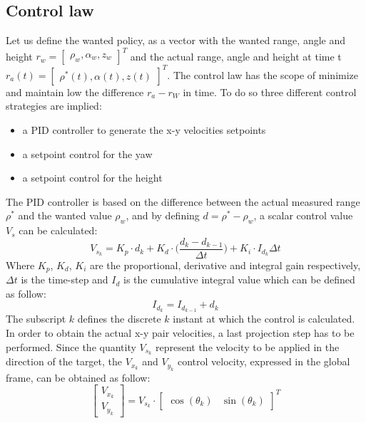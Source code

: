 \subsection{Control law}\label{control_law}
Let us define the wanted policy, as a vector with the wanted range, angle and height $r_w = \begin{bmatrix} \rho_w, \alpha_w, z_w\end{bmatrix}^T$ and the actual range, angle and height at time t $r_a(t) = \begin{bmatrix} \rho^* (t) , \alpha(t), z(t) \end{bmatrix}^T$. The control law has the scope of minimize and maintain low the difference $r_a - r_W$ in time. To do so three different control strategies are implied:
\begin{itemize}
    \item a PID controller to generate the x-y velocities setpoints
    \item a setpoint control for the yaw
    \item a setpoint control for the height
\end{itemize}
The PID controller is based on the difference between the actual measured range $\rho^*$ and the wanted value $\rho_w$, and by defining $d = \rho^* - \rho_w$, a scalar control value $V_s$ can be calculated:
\begin{equation}
    V_{s_k} = K_p\cdot d_k + K_d\cdot\Big(\frac{d_k - d_{k-1}}{\Delta t}\Big) + K_i\cdot I_{d_k}\Delta t
\end{equation}
Where $K_p$, $K_d$, $K_i$ are the proportional, derivative and integral gain respectively, $\Delta t$ is the time-step and $I_d$ is the cumulative integral value which can be defined as follow:
\[
    I_{d_k} = I_{d_{k-1}} + d_k
\]
The subscript $k$ defines the discrete $k$ instant at which the control is calculated. In order to obtain the actual x-y pair velocities, a last projection step has to be performed. Since the quantity $V_{s_k}$ represent the velocity to be applied in the direction of the target, the $V_{x_k}$ and $V_{y_k}$ control velocity, expressed in the global frame, can be obtained as follow:
\begin{equation}\label{PF:VELxy}
    \begin{bmatrix} V_{x_k} \\ V_{y_k} \end{bmatrix} = V_{s_k} \cdot \begin{bmatrix} \cos (\theta_k) & \sin (\theta_k) \end{bmatrix}^T
\end{equation}

